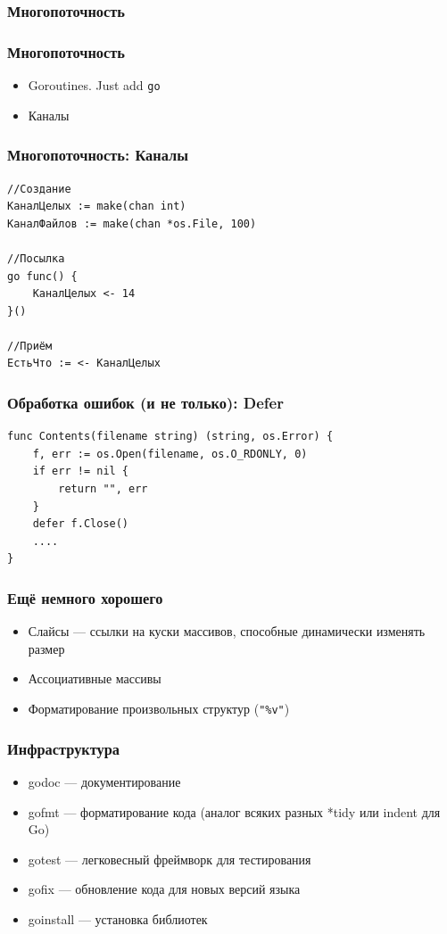 \documentclass{beamer}
\begin{document}
\begin{frame}
  \frametitle{Многопоточность}
  \Large{\textit{\color{ExclamMark}{Не общайтесь с помощью раздельной памяти. Разделяйте память с помощью общения}}}
\end{frame}

\begin{frame}
  \frametitle{Многопоточность}
  \begin{itemize}
  \item Goroutines. Just add \texttt{go}
    \pause
  \item Каналы
  \end{itemize}
\end{frame}


\begin{frame}[fragile]
  \frametitle{Многопоточность: Каналы}
\begin{verbatim}
//Создание
КаналЦелых := make(chan int)
КаналФайлов := make(chan *os.File, 100)

//Посылка
go func() {
    КаналЦелых <- 14
}()

//Приём
ЕстьЧто := <- КаналЦелых
\end{verbatim}
\end{frame}


\begin{frame}[fragile]
  \frametitle{Обработка ошибок (и не только): Defer}
\begin{verbatim}
func Contents(filename string) (string, os.Error) {
    f, err := os.Open(filename, os.O_RDONLY, 0)
    if err != nil {
        return "", err
    }
    defer f.Close()
    ....
}
\end{verbatim}
\end{frame}


\begin{frame}
  \frametitle{Ещё немного хорошего}
  \begin{itemize}
  \item Слайсы — ссылки на куски массивов, способные динамически изменять размер
  \item Ассоциативные массивы
  \item Форматирование произвольных структур (\texttt{"\%v"})
  \end{itemize}
\end{frame}

\begin{frame}
  \frametitle{Инфраструктура}
  \begin{itemize}
  \item godoc — документирование
  \item gofmt — форматирование кода (аналог всяких разных *tidy или indent для Go)
  \item gotest — легковесный фреймворк для тестирования
  \item gofix — обновление кода для новых версий языка
  \item goinstall — установка библиотек
  \end{itemize}
\end{frame}
\end{document}
